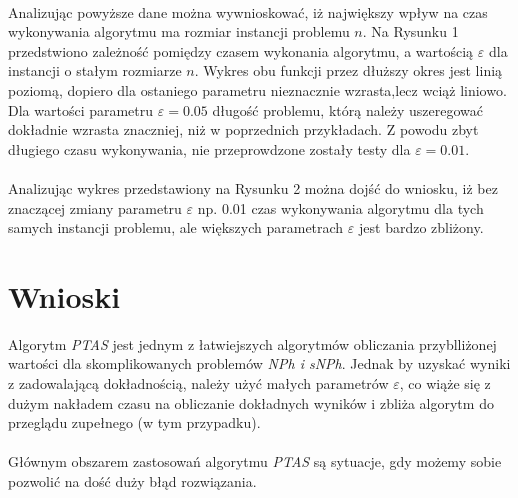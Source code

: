 \documentclass[wide,a4paper,titlepage,12pt] {article}
\begin{document}
\paragraph{} %
Analizując powyższe dane można wywnioskować, iż największy wpływ na czas wykonywania algorytmu ma rozmiar instancji problemu $n$. Na Rysunku 1 przedstwiono zależność pomiędzy czasem wykonania algorytmu, a wartością $\varepsilon$ dla instancji o stałym rozmiarze $n$. Wykres obu funkcji przez dłuższy okres jest linią poziomą, dopiero dla ostaniego parametru nieznacznie wzrasta,lecz wciąż liniowo. Dla wartości parametru $\varepsilon = 0.05$ długość problemu, którą należy uszeregować dokładnie wzrasta znaczniej, niż w poprzednich przykładach. Z powodu zbyt długiego czasu wykonywania, nie przeprowdzone zostały testy dla $\varepsilon = 0.01$.

\paragraph{}
Analizując wykres przedstawiony na Rysunku 2 można dojść do wniosku, iż bez znaczącej zmiany parametru $\varepsilon$ np. 0.01 czas wykonywania algorytmu dla tych samych instancji problemu, ale większych parametrach $\varepsilon$ jest bardzo zbliżony.   

\section{Wnioski}
Algorytm \textit{PTAS} jest jednym z łatwiejszych algorytmów obliczania przyblliżonej wartości dla skomplikowanych problemów \textit{NPh i sNPh}. Jednak by uzyskać wyniki z zadowalającą dokładnością, należy użyć małych parametrów $\varepsilon$, co wiąże się z dużym nakładem czasu na obliczanie dokładnych wyników i zbliża algorytm do przeglądu zupełnego (w tym przypadku).

\paragraph{}
Głównym obszarem zastosowań algorytmu \textit{PTAS} są sytuacje, gdy możemy sobie pozwolić na dość duży błąd rozwiązania. 
\end{document}
